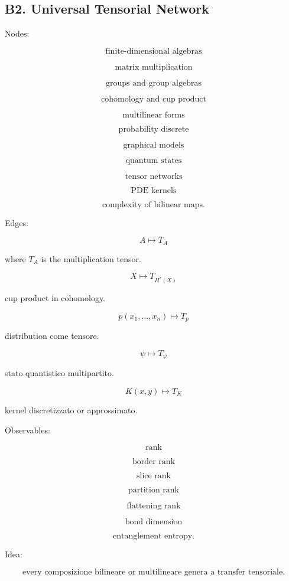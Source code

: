 \documentclass[11pt]{article}
\begin{document}
\subsection{B2. Universal Tensorial Network}

Nodes:

\[
\text{finite-dimensional algebras}
\]

\[
\text{matrix multiplication}
\]

\[
\text{groups and group algebras}
\]

\[
\text{cohomology and cup product}
\]

\[
\text{multilinear forms}
\]

\[
\text{probability discrete}
\]

\[
\text{graphical models}
\]

\[
\text{quantum states}
\]

\[
\text{tensor networks}
\]

\[
\text{PDE kernels}
\]

\[
\text{complexity of bilinear maps}.
\]

Edges:

\[
A\mapsto T_A
\]

where \(T_A\) is the multiplication tensor.

\[
X\mapsto T_{H^\ast(X)}
\]

cup product in cohomology.

\[
p(x_1,\ldots,x_n)\mapsto T_p
\]

distribution come tensore.

\[
\psi\mapsto T_\psi
\]

stato quantistico multipartito.

\[
K(x,y)\mapsto T_K
\]

kernel discretizzato or approssimato.

Observables:

\[
\text{rank}
\]

\[
\text{border rank}
\]

\[
\text{slice rank}
\]

\[
\text{partition rank}
\]

\[
\text{flattening rank}
\]

\[
\text{bond dimension}
\]

\[
\text{entanglement entropy}.
\]

Idea:

\[
\text{every composizione bilineare or multilineare genera a transfer tensoriale.}
\]
\end{document}
